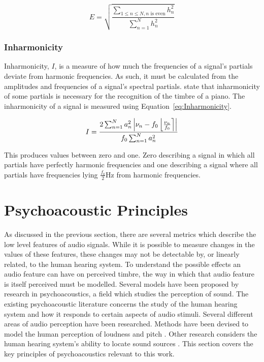 			\begin{equation}
				E = \sqrt{\frac{\sum_{1 \leq n \leq N, n \text{ is even}} h_{n}^{2}}
					       {\sum_{n = 1}^{N} h_{n}^{2}}}
				\label{eq:Evenness}
			\end{equation}

		\subsubsection*{Inharmonicity}
			Inharmonicity, $I$, is a measure of how much the frequencies of a signal's partials deviate from
			harmonic frequencies. As such, it must be calculated from the amplitudes and frequencies of a
			signal's spectral partials. \citet{fletcher1962quality} state that inharmonicity of some partials
			is necessary for the recognition of the timbre of a piano. The inharmonicity of a signal is
			measured using Equation~\ref{eq:Inharmonicity}.
			
			\begin{equation}
				I = \frac{2\sum_{n = 1}^{N}a_{n}^{2}
					   \left|\nu_{n} - f_{0}\left\lfloor\frac{\nu_{n}}{f_{0}}\right\rceil\right|}
					   {f_{0}\sum_{n = 1}^{N} a_{n}^{2}}
				\label{eq:Inharmonicity}
			\end{equation}

			This produces values between zero and one. Zero describing a signal in which all partials have
			perfectly harmonic frequencies and one describing a signal where all partials have frequencies
			lying $\frac{f_{0}}{2}$Hz from harmonic frequencies.

\section{Psychoacoustic Principles}
\label{sec:Timbre-PsychoacousticPrinciples}
	As discussed in the previous section, there are several metrics which describe the low level features of audio
	signals. While it is possible to measure changes in the values of these features, these changes may not be
	detectable by, or linearly related, to the human hearing system. To understand the possible effects an audio
	feature can have on perceived timbre, the way in which that audio feature is itself perceived must be modelled.
	Several models have been proposed by research in psychoacoustics, a field which studies the perception of sound.
	The existing psychoacoustic literature concerns the study of the human hearing system and how it responds to
	certain aspects of audio stimuli.  Several different areas of audio perception have been researched. Methods have
	been devised to model the human perception of loudness \citep{moore1997a} and pitch \citep{gerhard2003pitch}. Other
	research considers the human hearing system's ability to locate sound sources \citep{blauert1997spatial}. This
	section covers the key principles of psychoacoustics relevant to this work.

